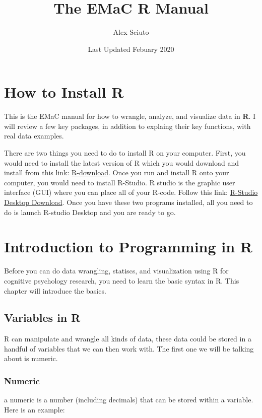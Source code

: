 \documentclass[]{book}
\title{The EMaC R Manual}
\author{Alex Sciuto}
\date{Last Updated Febuary 2020}
\begin{document}
\maketitle

{
\setcounter{tocdepth}{1}
\tableofcontents
}
\chapter{How to Install R}\label{download}

This is the EMaC manual for how to wrangle, analyze, and visualize data
in \textbf{R}. I will review a few key packages, in addition to explaing
their key functions, with real data examples.

There are two things you need to do to install R on your computer.
First, you would need to install the latest version of R which you would
download and install from this link:
\href{https://cloud.r-project.org/}{R-download}. Once you run and
install R onto your computer, you would need to install R-Studio. R
studio is the graphic user interface (GUI) where you can place all of
your R-code. Follow this link:
\href{https://rstudio.com/products/rstudio/download/}{R-Studio Desktop
Download}. Once you have these two programs installed, all you need to
do is launch R-studio Desktop and you are ready to go.

\chapter{Introduction to Programming in R}\label{intro}

Before you can do data wrangling, statiscs, and visualization using R
for cognitive psychology research, you need to learn the basic syntax in
R. This chapter will introduce the basics.

\section{Variables in R}\label{variables-in-r}

R can manipulate and wrangle all kinds of data, these data could be
stored in a handful of variables that we can then work with. The first
one we will be talking about is numeric.

\subsection{Numeric}\label{numeric}

a numeric is a number (including decimals) that can be stored within a
variable. Here is an example:
\end{document}
